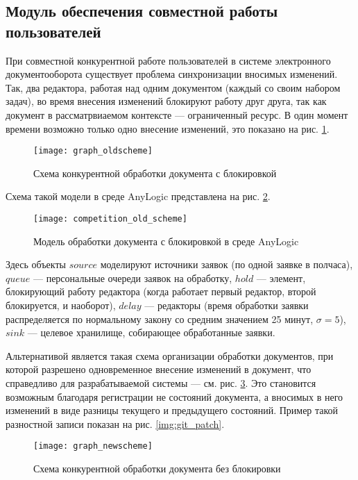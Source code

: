 \subsection{Модуль обеспечения совместной работы пользователей} \label{research_competition}

При совместной конкурентной работе пользователей в системе электронного документооборота существует проблема синхронизации вносимых изменений. Так, два редактора, работая над одним документом (каждый со своим набором задач), во время внесения изменений блокируют работу друг друга, так как документ в рассматрвиаемом контексте --- ограниченный ресурс. В один момент времени возможно только одно внесение изменений, это показано на рис. \ref{img:graph_oldscheme}.
\begin{figure}[h!]
  \centering
  \texttt{[image: graph\_oldscheme]}
  \caption{Схема конкурентной обработки документа с блокировкой}
  \label{img:graph_oldscheme}
\end{figure}

\vspace{\baselineskip}
Схема такой модели в среде AnyLogic представлена на рис. \ref{img:competition_old_scheme}.
\begin{figure}[h!]
  \centering
  \texttt{[image: competition\_old\_scheme]}
  \caption{Модель обработки документа с блокировкой в среде AnyLogic}
  \label{img:competition_old_scheme}
\end{figure}

Здесь объекты $source$ моделируют источники заявок (по одной заявке в полчаса), $queue$ --- персональные очереди заявок на обработку, $hold$ --- элемент, блокирующий работу редактора (когда работает первый редактор, второй блокируется, и наоборот), $delay$ --- редакторы (время обработки заявки распределяется по нормальному закону со средним значением 25 минут, $\sigma=5$), $sink$ --- целевое хранилище, собирающее обработанные заявки.

\vspace{\baselineskip}
Альтернативой является такая схема организации обработки документов, при которой разрешено одновременное внесение изменений в документ, что справедливо для разрабатываемой системы --- см. рис. \ref{img:graph_newscheme}. Это становится возможным благодаря регистрации не состояний документа, а вносимых в него изменений в виде разницы текущего и предыдущего состояний. Пример такой разностной записи показан на рис. \ref{img:git_patch}.

\begin{figure}[h!]
  \centering
  \texttt{[image: graph\_newscheme]}
  \caption{Схема конкурентной обработки документа без блокировки}
  \label{img:graph_newscheme}
\end{figure}

